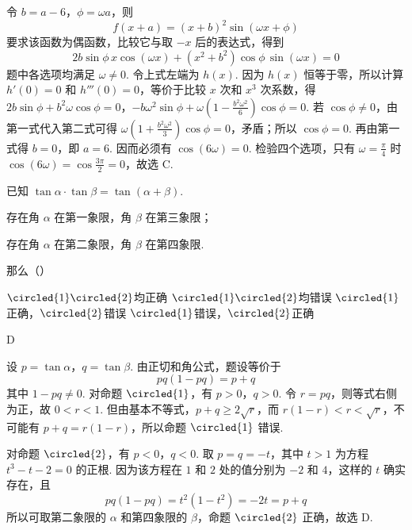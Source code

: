 \begin{solution}
令 \(b=a-6\)，\(\phi=\omega a\)，则
\[
f(x+a)=(x+b)^2\sin(\omega x+\phi)
\]
要求该函数为偶函数，比较它与取 \(-x\) 后的表达式，得到
\[
2b\sin\phi\,x\cos(\omega x)+(x^2+b^2)\cos\phi\,\sin(\omega x)=0
\]
题中各选项均满足 \(\omega\ne0\). 令上式左端为 \(h(x)\). 因为 \(h(x)\) 恒等于零，所以计算 \(h'(0)=0\) 和 \(h'''(0)=0\)，等价于比较 \(x\) 次和 \(x^3\) 次系数，得
\(2b\sin\phi+b^2\omega\cos\phi=0\)，\(-b\omega^2\sin\phi+\omega\left(1-\frac{b^2\omega^2}{6}\right)\cos\phi=0\).
若 \(\cos\phi\ne0\)，由第一式代入第二式可得 \(\omega\left(1+\frac{b^2\omega^2}{3}\right)\cos\phi=0\)，矛盾；所以 \(\cos\phi=0\). 再由第一式得 \(b=0\)，即 \(a=6\). 因而必须有 \(\cos(6\omega)=0\). 检验四个选项，只有 \(\omega=\frac\pi4\) 时 \(\cos(6\omega)=\cos\frac{3\pi}{2}=0\)，故选 C.
\end{solution}

\begin{problem}
已知 \(\tan\alpha\cdot\tan\beta=\tan(\alpha+\beta)\).

\begin{circlelist}
\item 存在角 \(\alpha\) 在第一象限，角 \(\beta\) 在第三象限；
\item 存在角 \(\alpha\) 在第二象限，角 \(\beta\) 在第四象限.
\end{circlelist}

那么（\quad）

\choices
    {\(\circled{1}\circled{2}\)均正确}
    {\(\circled{1}\circled{2}\)均错误}
    {\(\circled{1}\)正确，\(\circled{2}\)错误}
    {\(\circled{1}\)错误，\(\circled{2}\)正确}
\end{problem}

\begin{answer}
D
\end{answer}

\begin{solution}
设 \(p=\tan\alpha\)，\(q=\tan\beta\). 由正切和角公式，题设等价于
\[
pq(1-pq)=p+q
\]
其中 \(1-pq\ne0\). 对命题 \(\circled{1}\)，有 \(p>0\)，\(q>0\). 令 \(r=pq\)，则等式右侧为正，故 \(0<r<1\). 但由基本不等式，\(p+q\ge2\sqrt r\)，而 \(r(1-r)<r<\sqrt r\)，不可能有 \(p+q=r(1-r)\)，所以命题 \(\circled{1}\) 错误.

对命题 \(\circled{2}\)，有 \(p<0\)，\(q<0\). 取 \(p=q=-t\)，其中 \(t>1\) 为方程 \(t^3-t-2=0\) 的正根. 因为该方程在 \(1\) 和 \(2\) 处的值分别为 \(-2\) 和 \(4\)，这样的 \(t\) 确实存在，且
\[
pq(1-pq)=t^2(1-t^2)=-2t=p+q
\]
所以可取第二象限的 \(\alpha\) 和第四象限的 \(\beta\)，命题 \(\circled{2}\) 正确，故选 D.
\end{solution}


